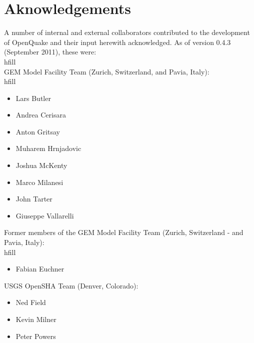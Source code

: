\chapter*{Aknowledgements}
A number of internal and external collaborators contributed to 
the development of OpenQuake and their input herewith acknowledged. 
As of version 0.4.3 (September 2011), these were: \\hfill \\
GEM Model Facility Team (Zurich, Switzerland, and Pavia, Italy): \\hfill \\
\begin{itemize}
\item Lars Butler
\item Andrea Cerisara
\item Anton Gritsay
\item Muharem Hrnjadovic
\item Joshua McKenty
\item Marco Milanesi
\item John Tarter
\item Giuseppe Vallarelli
\end{itemize}
Former members of the GEM Model Facility Team (Zurich, Switzerland -  
and Pavia, Italy): \\hfill \\
\begin{itemize}
\item Fabian Euchner
\end{itemize}
USGS OpenSHA Team (Denver, Colorado):
\begin{itemize}
\item Ned Field
\item Kevin Milner
\item Peter Powers
\end{itemize}

